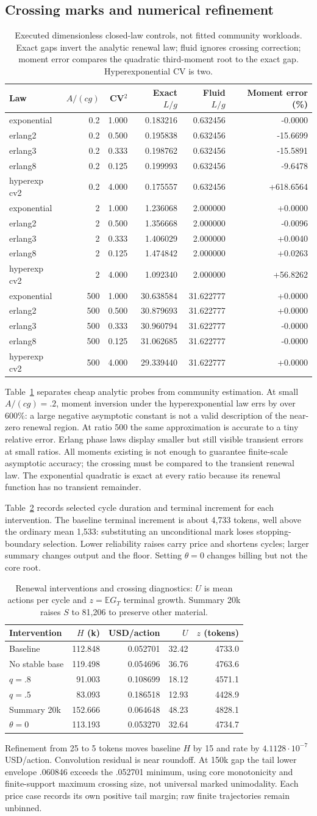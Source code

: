 \documentclass[sigconf,screen,nonacm]{acmart}
\makeatletter
\newcommand{\E}{\mathbb{E}}
\newcommand{\PaperRenewalScenarios}{%
\begin{tabular}{@{}lrrrr@{}}\toprule
Intervention & $H$ (k) & USD/action & $U$ & $z$ (tokens)\\\midrule
Baseline & 112.848 & 0.052701 & 32.42 & 4733.0\\
No stable base & 119.498 & 0.054696 & 36.76 & 4763.6\\
$q=.8$ & 91.003 & 0.108699 & 18.12 & 4571.1\\
$q=.5$ & 83.093 & 0.186518 & 12.93 & 4428.9\\
Summary 20k & 152.666 & 0.064648 & 48.23 & 4828.1\\
$\theta=0$ & 113.193 & 0.053270 & 32.64 & 4734.7\\\bottomrule
\end{tabular}}
\newcommand{\PaperClosedLawControls}{%
\begin{tabular}{@{}lrrrrr@{}}\toprule
Law & $A/(cg)$ & CV$^2$ & Exact $L/g$ & Fluid $L/g$ & Moment error (\%)\\\midrule
exponential & 0.2 & 1.000 & 0.183216 & 0.632456 & -0.0000\\
erlang2 & 0.2 & 0.500 & 0.195838 & 0.632456 & -15.6699\\
erlang3 & 0.2 & 0.333 & 0.198762 & 0.632456 & -15.5891\\
erlang8 & 0.2 & 0.125 & 0.199993 & 0.632456 & -9.6478\\
hyperexp cv2 & 0.2 & 4.000 & 0.175557 & 0.632456 & +618.6564\\
exponential & 2 & 1.000 & 1.236068 & 2.000000 & +0.0000\\
erlang2 & 2 & 0.500 & 1.356668 & 2.000000 & -0.0096\\
erlang3 & 2 & 0.333 & 1.406029 & 2.000000 & +0.0040\\
erlang8 & 2 & 0.125 & 1.474842 & 2.000000 & +0.0263\\
hyperexp cv2 & 2 & 4.000 & 1.092340 & 2.000000 & +56.8262\\
exponential & 500 & 1.000 & 30.638584 & 31.622777 & +0.0000\\
erlang2 & 500 & 0.500 & 30.879693 & 31.622777 & +0.0000\\
erlang3 & 500 & 0.333 & 30.960794 & 31.622777 & -0.0000\\
erlang8 & 500 & 0.125 & 31.062685 & 31.622777 & -0.0000\\
hyperexp cv2 & 500 & 4.000 & 29.339440 & 31.622777 & +0.0000\\\bottomrule
\end{tabular}}
\makeatother
\begin{document}
\subsection{Crossing marks and numerical refinement}
\begin{table}[t]
\centering\small
\caption{Executed dimensionless closed-law controls, not fitted community
workloads. Exact gaps invert the analytic renewal law; fluid ignores
crossing correction; moment error compares the quadratic third-moment
root to the exact gap. Hyperexponential CV is two.}
\label{tab:closed-law-controls}\PaperClosedLawControls
\end{table}

Table~\ref{tab:closed-law-controls} separates cheap analytic probes from
community estimation. At small $A/(cg)=.2$, moment inversion under the
hyperexponential law errs by over 600\%: a large negative asymptotic
constant is not a valid description of the near-zero renewal region.
At ratio 500 the same approximation is accurate to a tiny relative
error. Erlang phase laws display smaller but still visible transient
errors at small ratios. All moments existing is not enough to guarantee
finite-scale asymptotic accuracy; the crossing must be compared to
the transient renewal law. The exponential quadratic is exact at every
ratio because its renewal function has no transient remainder.

Table~\ref{tab:renewal-scenarios} records selected cycle duration and
terminal increment for each intervention. The baseline terminal increment
is about 4,733 tokens, well above the ordinary mean 1,533: substituting
an unconditional mark loses stopping-boundary selection. Lower reliability
raises carry price and shortens cycles; larger summary changes output and
the floor. Setting $\theta=0$ changes billing but not the core root.

\begin{table}[t]
\centering\small
\caption{Renewal interventions and crossing diagnostics: $U$ is mean
actions per cycle and $z=\E G_T$ terminal growth. Summary 20k raises
$S$ to 81,206 to preserve other material.}
\label{tab:renewal-scenarios}\PaperRenewalScenarios
\end{table}

Refinement from 25 to 5 tokens moves baseline $H$ by 15 and rate by
$4.1128\cdot10^{-7}$ USD/action. Convolution residual is near roundoff.
At 150k gap the tail lower envelope .060846 exceeds the .052701 minimum,
using core monotonicity and finite-support maximum crossing size, not
universal marked unimodality. Each price case records its own positive
tail margin; raw finite trajectories remain unbinned.
\end{document}
